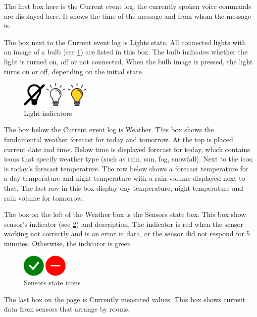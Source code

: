 The first box here is the Current event log, the currently spoken voice commands are displayed here. It shows the time of the message and from whom the message is. 

The box next to the Current event log is Lights state. All connected lights with an image of a bulb (see \cref{fig:light_indicators}) are listed in this box. The bulb indicates whether the light is turned on, off or not connected. When the bulb image is pressed, the light turns on or off, depending on the initial state.

\begin{figure}[H]
    \centering
    \includegraphics[width=0.3\textwidth]{img/bulb_light_icon.png}
    \caption{Light indicators}
    \label{fig:light_indicators}
\end{figure}

The box below the Current event log is Weather. This box shows the fundamental weather forecast for today and tomorrow. At the top is placed current date and time. Below time is displayed forecast for today, which contains icons that specify weather type (such as rain, sun, fog, snowfall). Next to the icon is today's forecast temperature. The row below shows a forecast temperature for a day temperature and night temperature with a rain volume displayed next to that. The last row in this box display day temperature, night temperature and rain volume for tomorrow.

The box on the left of the Weather box is the Sensors state box. This box show sensor's indicator (see \cref{fig:sensors_state_icons}) and description. The indicator is red when the sensor working not correctly and is an error in data, or the sensor did not respond for 5 minutes. Otherwise, the indicator is green.

\begin{figure}[H]
    \centering
    \includegraphics[width=0.2\textwidth]{img/sensors_state_icons.png}
    \caption{Sensors state icons}
    \label{fig:sensors_state_icons}
\end{figure}

The last box on the page is Currently measured values. This box shows current data from sensors that arrange by rooms.

